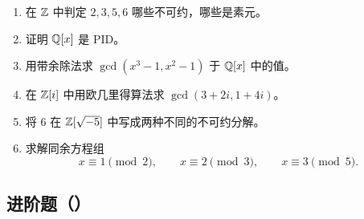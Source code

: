 \begin{enumerate}[label=\textbf{9.\arabic*}, leftmargin=*]
  \item \basic 在 $\mathbb{Z}$ 中判定 $2,3,5,6$ 哪些不可约，哪些是素元。
  \item \basic 证明 $\mathbb{Q}[x]$ 是 PID。
  \item \basic 用带余除法求 $\gcd(x^3-1,x^2-1)$ 于 $\mathbb{Q}[x]$ 中的值。
  \item \basic 在 $\mathbb{Z}[i]$ 中用欧几里得算法求 $\gcd(3+2i,1+4i)$。
  \item \basic 将 $6$ 在 $\mathbb{Z}[\sqrt{-5}]$ 中写成两种不同的不可约分解。
  \item \basic 求解同余方程组
  \[
  x\equiv 1\pmod 2,
  \qquad
  x\equiv 2\pmod 3,
  \qquad
  x\equiv 3\pmod 5.
  \]
\end{enumerate}

\subsection*{进阶题（\medium）}

